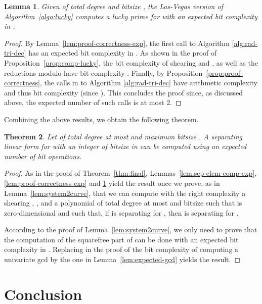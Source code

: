 \documentclass{sig-alternate}
\newtheorem{theorem}{Theorem}
\newtheorem{lemma}[theorem]{Lemma}
\newcommand{\blue}[1]{\color{blue}#1\color{black}\xspace}
\renewcommand{\blue}[1]{#1\xspace}
\begin{document}
\begin{lemma}\label{lem:lucky-exp}
Given  of total degree  and bitsize , 
the Las-Vegas version of Algorithm~\ref{algo:lucky} computes a lucky prime  for  with an expected bit complexity in  .
\end{lemma}
\begin{proof}
By Lemma~\ref{lem:proof-correctness-exp}, the first call to Algorithm \ref{alg:rad-tri-dec} has
an expected bit complexity in . As shown in the proof of Proposition~\ref{prop:comp-lucky}, the
bit complexity of shearing  and , as well as the reductions modulo
 have  bit complexity . Finally, by Proposition~\ref{prop:proof-correctness}, the calls  in  to Algorithm
\ref{alg:rad-tri-dec} have arithmetic complexity  and thus bit complexity 
(since ). This concludes the proof since, as discussed above,  the expected number of such calls is
at most 2.
\end{proof}


Combining the above results, we obtain the following theorem.


 \begin{theorem}\label{thm:las-vegas}
Let  of total degree at most  and maximum bitsize . A separating linear form  for  with  an integer of bitsize in   can be computed using an expected number of  bit operations.
\end{theorem}

\begin{proof}
As in the proof of Theorem~\ref{thm:final}, Lemmas~\ref{lem:sep-elem-comp-exp},
\ref{lem:proof-correctness-exp} and \ref{lem:lucky-exp} yield the result once we prove, as in
Lemma~\ref{lem:system2curve}, that we can compute with the right complexity a
\blue{shearing}
 , , and a polynomial  of total degree at most
 and bitsize   such that  is
zero-dimensional and such that, if  is separating for , then 
 is separating for .
 
According to the proof of Lemma~\ref{lem:system2curve}, we only need to prove that the computation of the squarefree part of  can be done with an expected bit complexity in . Replacing in the proof of \cite[Lemma 13]{sagraloff2013} the bit complexity of computing a univariate gcd by the one in Lemma~\ref{lem:expected-gcd} yields the result.  
\end{proof}







\section{Conclusion}
\end{document}
